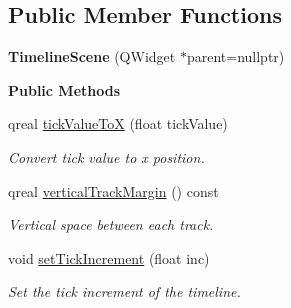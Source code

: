 \subsection*{Public Member Functions}
\begin{DoxyCompactItemize}
\item 
\mbox{\label{classrev_1_1_view_1_1_timeline_scene_ac30389e1ea4129b52bb5ccaf4821573f}} 
{\bfseries Timeline\+Scene} (Q\+Widget $\ast$parent=nullptr)
\end{DoxyCompactItemize}
\begin{Indent}\textbf{ Public Methods}\par
\begin{DoxyCompactItemize}
\item 
\mbox{\label{classrev_1_1_view_1_1_timeline_scene_a403eff80e209db3f5b01b40ebadf9c3f}} 
qreal \mbox{\hyperlink{classrev_1_1_view_1_1_timeline_scene_a403eff80e209db3f5b01b40ebadf9c3f}{tick\+Value\+ToX}} (float tick\+Value)
\begin{DoxyCompactList}\small\item\em Convert tick value to x position. \end{DoxyCompactList}\item 
\mbox{\label{classrev_1_1_view_1_1_timeline_scene_a82a1a929ef61d10bc99e2353a82c70ec}} 
qreal \mbox{\hyperlink{classrev_1_1_view_1_1_timeline_scene_a82a1a929ef61d10bc99e2353a82c70ec}{vertical\+Track\+Margin}} () const
\begin{DoxyCompactList}\small\item\em Vertical space between each track. \end{DoxyCompactList}\item 
\mbox{\label{classrev_1_1_view_1_1_timeline_scene_a37accac2efb6596dc46491e400811c7d}} 
void \mbox{\hyperlink{classrev_1_1_view_1_1_timeline_scene_a37accac2efb6596dc46491e400811c7d}{set\+Tick\+Increment}} (float inc)
\begin{DoxyCompactList}\small\item\em Set the tick increment of the timeline. \end{DoxyCompactList}\end{DoxyCompactItemize}
\end{Indent}
